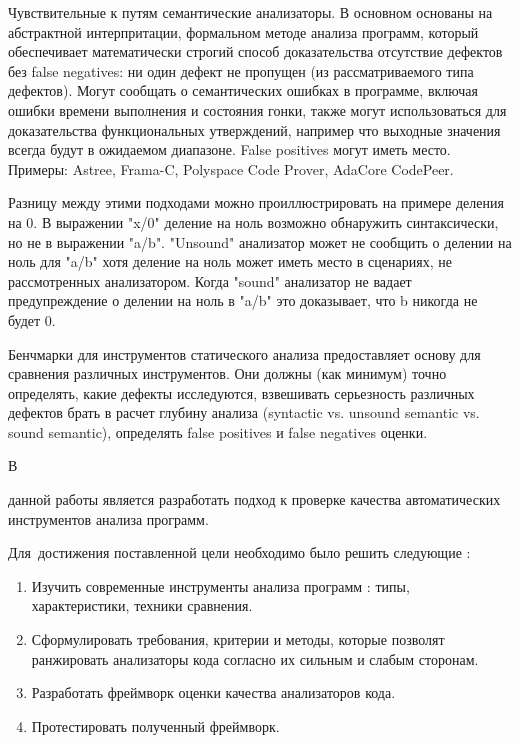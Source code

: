 Чувствительные к путям семантические анализаторы. В основном основаны на абстрактной 
интерпритации, формальном методе анализа программ, который обеспечивает математически
строгий способ доказательства отсутствие дефектов без false negatives: ни один дефект 
не пропущен (из рассматриваемого типа дефектов). Могут сообщать о 
семантических ошибках в программе, включая ошибки времени выполнения и состояния гонки,
также могут использоваться для доказательства функциональных утверждений, например что 
выходные значения всегда будут в ожидаемом диапазоне. False positives могут иметь место. 
Примеры: Astree\autocite{Astree},
Frama-C\autocite{Frama}, Polyspace Code Prover\autocite{Polyspace2prover}, 
AdaCore CodePeer\autocite{Codepeer}.

Разницу между этими подходами можно проиллюстрировать на примере деления на 0. В выражении 
"x/0" деление на ноль возможно обнаружить синтаксически, но не в выражении "a/b". "Unsound" анализатор 
может не сообщить о делении на ноль для "a/b" хотя деление на ноль может иметь место в сценариях,
не рассмотренных анализатором. Когда "sound" анализатор не вадает предупреждение о делении на ноль
в "a/b" это доказывает, что b никогда не будет 0. 

Бенчмарки для инструментов статического анализа предоставляет основу для сравнения
различных инструментов. Они должны (как минимум) точно определять, какие дефекты исследуются,
взвешивать серьезность различных дефектов %
брать в расчет глубину анализа (syntactic vs. unsound semantic vs. sound semantic), определять
false positives и false negatives оценки.

В 



{\aim} данной работы является разработать подход к проверке качества автоматических инструментов анализа программ.

Для~достижения поставленной цели необходимо было решить следующие {\tasks}:
\begin{enumerate}[beginpenalty=10000] %
  \item Изучить современные инструменты анализа программ : типы, характеристики, техники сравнения.  
  \item Сформулировать требования, критерии и методы, которые позволят ранжировать анализаторы кода
      согласно их сильным и слабым сторонам.
  \item Разработать фреймворк оценки качества анализаторов кода. 
  \item Протестировать полученный фреймворк.
\end{enumerate}


